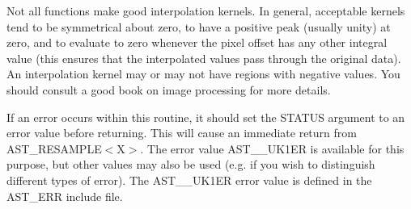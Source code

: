 \documentclass[twoside,11pt]{article}
\begin{document}
{{{         \sstitem
         Not all functions make good interpolation kernels. In general,
         acceptable kernels tend to be symmetrical about zero, to have a
         positive peak (usually unity) at zero, and to evaluate to zero
         whenever the pixel offset has any other integral value (this
         ensures that the interpolated values pass through the original
         data). An interpolation kernel may or may not have regions with
         negative values. You should consult a good book on image
         processing for more details.

         \sstitem
         If an error occurs within this routine, it should set the
         STATUS argument to an error value before returning. This will
         cause an immediate return from AST\_RESAMPLE$<$X$>$. The error value
         AST\_\_UK1ER is available for this purpose, but other values may also
         be used (e.g. if you wish to distinguish different types of error).
         The AST\_\_UK1ER error value is defined in the AST\_ERR include file.
      }
   }
}
\end{document}
